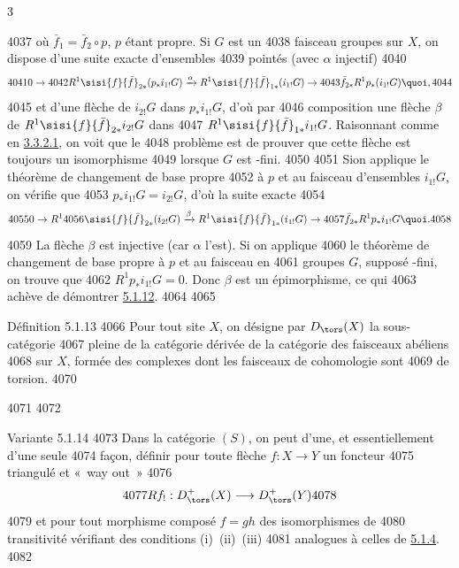 3	\documentclass[10pt]{../fichiers-configuration-latex/smfart}
\begin{document}
  4037	où $\bar{f}_{1}=\bar{f}_2\circ p$, $p$ étant propre. Si $G$ est un
  4038	faisceau  groupes sur $X$, on dispose d'une suite exacte d'ensembles
  4039	pointés (avec $\alpha$ injectif)
  4040	\[
  4041	0\rightarrow
  4042	R^{1}\sisi{f}{\bar{f}}_{2\ast}(p_{\ast}i_{1!}G)\xrightarrow{\alpha}R^{1}\sisi{f}{\bar{f}}_{1\ast}(i_{1!}G)\rightarrow
  4043	\bar{f}_{2\ast}R^{1}p_{\ast}(i_{1!}G){\quoi},
  4044	\]
  4045	et d'une flèche de $i_{2!}G$ dans $p_{\ast}i_{1!}G$, d'où par
  4046	composition une flèche $\beta$ de $R^{1}\sisi{f}{\bar{f}}_{2\ast}i_{2!}G$ dans
  4047	$R^{1}\sisi{f}{\bar{f}}_{1\ast}i_{1!}G$. Raisonnant comme en \hyperref[XVII.par3.3.2.1]{3.3.2.1}, on voit que le
  4048	problème est de prouver que cette flèche est toujours un isomorphisme
  4049	lorsque $G$ est \iInd-fini.
  4050	
  4051	Si\pageoriginale on applique le théorème de changement de base propre
  4052	à $p$ et au faisceau d'ensembles $i_{1!}G$, on vérifie que
  4053	$p_{\ast}i_{1!}G=i_{2!}G$, d'où la suite exacte
  4054	\[
  4055	0\rightarrow R^{1}
  4056	\sisi{f}{\bar{f}}_{2\ast}(i_{2!}G)\xrightarrow{\beta}R^{1}\sisi{f}{\bar{f}}_{1\ast}(i_{1!}G)\rightarrow
  4057	\bar{f}_{2\ast}R^{1}p_{\ast}i_{1!}G{\quoi}.
  4058	\]
  4059	La flèche $\beta$ est injective (car $\alpha$ l'est). Si on applique
  4060	le théorème de changement de base propre à $p$ et au faisceau en
  4061	groupes $G$, supposé \iInd-fini, on trouve que
  4062	$R^{1}p_{\ast}i_{1!}G=0$. Donc $\beta$ est un épimorphisme, ce qui
  4063	achève de démontrer \hyperref[XVII.var5.1.12]{5.1.12}.
  4064	
  4065	\begin{enonce*}{Définition 5.1.13}
  4066	Pour tout site $X$, on désigne par $D_{\tors}(X)$ la sous-catégorie
  4067	pleine de la catégorie dérivée de la catégorie des faisceaux abéliens
  4068	sur $X$, formée des complexes dont les faisceaux de cohomologie sont
  4069	de torsion.
  4070	\end{enonce*}
  4071	
  4072	\begin{enonce*}{Variante 5.1.14}
  4073	Dans la catégorie $(S)$, on peut d'une, et essentiellement d'une seule
  4074	façon, définir pour toute flèche $f:X\rightarrow Y$ un foncteur
  4075	triangulé et « way out »  \emph{\cite[I 7]{RD}}
  4076	\[
  4077	Rf_{!}:D^{+}_{\tors}(X)\longrightarrow D^{+}_{\tors}(Y)
  4078	\]
  4079	et pour tout morphisme composé $f=gh$ des isomorphismes de
  4080	transitivité vérifiant des conditions \mbox{\rm (i) (ii) (iii)}
  4081	analogues à celles de \hyperref[XVII.subsubsec5.1.4]{5.1.4}.
  4082	\end{enonce*}
\end{document}

